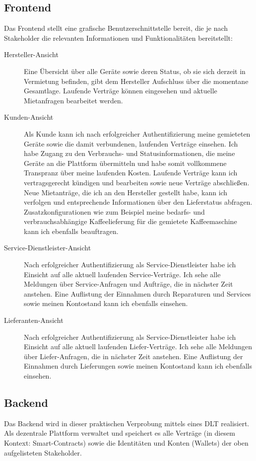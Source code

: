 \subsection{Frontend}
\label{subsec:iot_usecase:solution:frontend}
Das Frontend stellt eine grafische Benutzerschnittstelle bereit, die je nach Stakeholder die relevanten Informationen und Funktionalitäten bereitstellt:
\begin{description}
  \item[Hersteller-Ansicht] Eine Übersicht über alle Geräte sowie deren Status, ob sie sich derzeit in Vermietung befinden, gibt dem Hersteller Aufschluss über die momentane Gesamtlage. Laufende Verträge können eingesehen und aktuelle Mietanfragen bearbeitet werden.
  \item[Kunden-Ansicht] Als Kunde kann ich nach erfolgreicher Authentifizierung meine gemieteten Geräte sowie die damit verbundenen, laufenden Verträge einsehen. Ich habe Zugang zu den Verbrauchs- und Statusinformationen, die meine Geräte an die Plattform übermitteln und habe somit vollkommene Transpranz über meine laufenden Kosten. Laufende Verträge kann ich vertragsgerecht kündigen und bearbeiten sowie neue Verträge abschließen. Neue Mietanträge, die ich an den Hersteller gestellt habe, kann ich verfolgen und entsprechende Informationen über den Lieferstatus abfragen. Zusatzkonfigurationen wie zum Beispiel meine bedarfs- und verbrauchsabhängige Kaffeelieferung für die gemietete Kaffeemaschine kann ich ebenfalls beauftragen.
  \item[Service-Dienstleister-Ansicht] Nach erfolgreicher Authentifizierung als Service-Dienstleister habe ich Einsicht auf alle aktuell laufenden Service-Verträge. Ich sehe alle Meldungen über Service-Anfragen und Aufträge, die in nächster Zeit anstehen. Eine Auflistung der Einnahmen durch Reparaturen und Services sowie meinen Kontostand kann ich ebenfalls einsehen.
  \item[Lieferanten-Ansicht] Nach erfolgreicher Authentifizierung als Service-Dienstleister habe ich Einsicht auf alle aktuell laufenden Liefer-Verträge. Ich sehe alle Meldungen über Liefer-Anfragen, die in nächster Zeit anstehen. Eine Auflistung der Einnahmen durch Lieferungen sowie meinen Kontostand kann ich ebenfalls einsehen.
\end{description}

\subsection{Backend}
\label{subsec:iot_usecase:solution:backend}
Das Backend wird in dieser praktischen Verprobung mittels eines \ac{DLT} realisiert. Als dezentrale Plattform verwaltet und speichert es alle Verträge (in diesem Kontext: Smart-Contracts) sowie die Identitäten und Konten (Wallets) der oben aufgelisteten Stakeholder.

